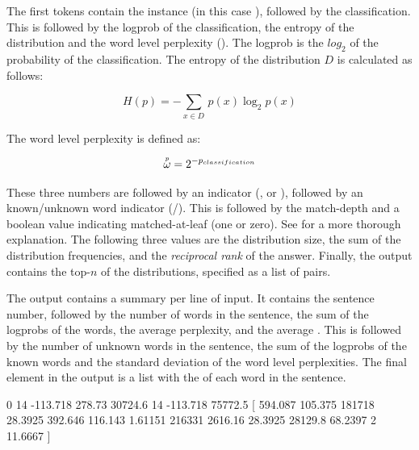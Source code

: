 \documentclass[a4paper,10pt,twoside]{report}
\begin{document}
The first tokens contain the instance (in this case ),
followed by the classification. This is followed by the logprob of the
classification, the entropy of the distribution and the word level
perplexity (\wlp{}). The logprob is the $log_2$ of the probability of the
classification. The entropy of the distribution $D$ is calculated as
follows:

\begin{equation}
H(p) = -\sum_{x \in D} \, p(x)\log_2 p(x)
\label{eq:entropy}
\end{equation}

The word level perplexity is defined as:

\begin{equation}
\accentset{p}{\omega}{} = 2^{-p_{classification}}
\label{eq:wlp}
\end{equation}

These three numbers are followed by an indicator (, 
or ), followed by an known/unknown word indicator
(/). This is followed by the match-depth and a boolean
value indicating matched-at-leaf (one or zero). See
\cite{Daelemans+09} for a more thorough explanation. The following
three values are the distribution size, the sum of the distribution
frequencies, and the \emph{reciprocal rank} of the answer. Finally,
the output contains the top-$n$ of the distributions, specified as a
list of  pairs.

The  output contains a summary per line of input. It
contains the sentence number, followed by the number of words in the
sentence, the sum of the logprobs of the words, the average
perplexity, and the average \wlp{}. This is followed by
the number of unknown words in the sentence, the sum of the logprobs
of the known words and the standard deviation of the word level
perplexities. The final element in the output is a list with the
\wlp{} of each word in the sentence.

\begin{wout}{}
0 14 -113.718 278.73 30724.6 14 -113.718 75772.5 [ 594.087 105.375
                     181718 28.3925 392.646 116.143 1.61151 216331
                     2616.16 28.3925 28129.8 68.2397 2 11.6667 ]
\end{wout}
\end{document}
